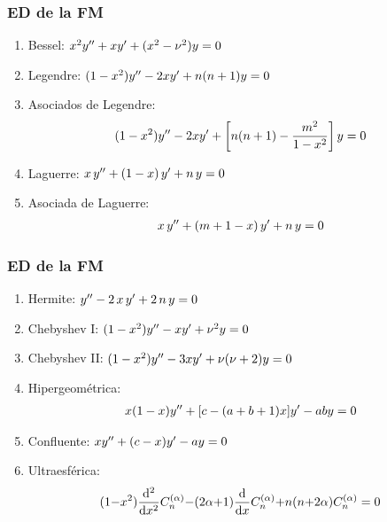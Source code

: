 \documentclass[12pt]{beamer}
\begin{document}
\begin{frame}
\frametitle{ED de la FM}
\begin{enumerate}[<+->]
\item Bessel: $x^{2} {y}^{\prime \prime} + x {y}^{\prime} + (x^{2} - \nu^{2}) y = 0$
\item Legendre: $(1 - x^{2}) {y}^{\prime \prime} - 2 x {y}^{\prime} + n (n + 1) y = 0$
\item Asociados de Legendre:
\begin{align*}
(1 - x^{2}) {y}^{\prime \prime} - 2 x {y}^{\prime} + \left[ n (n + 1) - \dfrac{m^{2}}{1- x^{2}} \right] y = 0
\end{align*}
\item Laguerre: $x \, {y}^{\prime \prime} + (1 - x) \, {y}^{\prime} + n \, y = 0$
\item Asociada de Laguerre:
\begin{align*}
x \, {y}^{\prime \prime} + (m + 1 - x) \, {y}^{\prime} + n \, y = 0
\end{align*}
\seti
\end{enumerate}
\end{frame}
\begin{frame}
\frametitle{ED de la FM}
\begin{enumerate}[<+->]
\conti
\item Hermite: ${y}^{\prime \prime} - 2 \, x \, {y}^{\prime} + 2 \, n \, y = 0$
\item Chebyshev I: $(1 -x^{2}) {y}^{\prime \prime} - x {y}^{\prime} + \nu^{2} y = 0$
\item Chebyshev II: $(1 -x^{2}) {y}^{\prime \prime} - 3 x {y}^{\prime} + \nu (\nu + 2) y = 0$
\item Hipergeométrica:
\begin{align*}
x (1 - x) {y}^{\prime \prime} + [c - (a + b + 1) x] {y}^{\prime} - a b y = 0
\end{align*}
\item Confluente: $x {y}^{\prime \prime} + (c - x) {y}^{\prime} - a y = 0$
\item Ultraesférica:
\begin{align*}
(1 {-} x^{2}) \dv[2]{x} C_{n}^{(\alpha)} {-} (2 \alpha {+} 1) \dv{x} C_{n}^{(\alpha)} {+} n (n {+} 2 \alpha) C_{n}^{(\alpha)} = 0
\end{align*}
\end{enumerate}
\end{frame}
\end{document}
